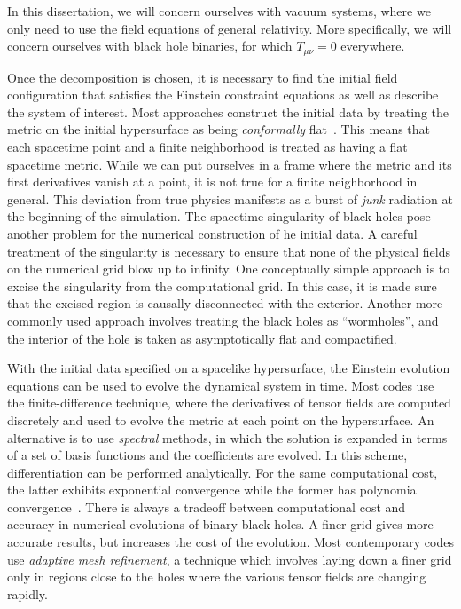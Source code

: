 In this dissertation, we will concern ourselves with vacuum systems, where 
we only need to use the field equations of general relativity. More 
specifically, we will concern ourselves with black hole binaries, for which 
$T_{\mu\nu}=0$ everywhere. 

% 
Once the decomposition is chosen, it is necessary to find the initial 
field configuration that satisfies the Einstein constraint equations as well as
describe the system of interest. Most approaches construct the initial 
data by treating the metric on the initial hypersurface as being 
{\it conformally} flat~\cite{Cook:2000vr}. 
This means that each spacetime point and a finite 
neighborhood is treated as having a flat spacetime metric.
While we can put ourselves in a frame where the metric and its first
derivatives vanish at a point, it is not true for a finite neighborhood in 
general.
This deviation from true physics manifests as a burst of {\it junk}
radiation at the beginning of the simulation. 
%
The spacetime singularity of black holes pose another problem for the 
numerical construction of he initial data. A careful treatment of the 
singularity is necessary to ensure that none of the physical fields on the
numerical grid blow up to infinity. One conceptually simple approach is to 
excise the singularity from the computational grid. In this case, it is
made sure that the excised region is causally disconnected with the exterior. 
Another more commonly used approach involves treating the black holes as 
``wormholes'', and the interior of the hole is taken as asymptotically
flat and compactified. 

With the initial data specified on a spacelike hypersurface, the Einstein 
evolution equations can be used to evolve the dynamical system in time. 
Most codes use the finite-difference technique, where the derivatives of 
tensor fields are computed discretely and used to evolve the metric at
each point on the hypersurface. An alternative is to use {\it spectral}
methods, in which the solution is expanded in terms of a set of basis functions
and the coefficients are evolved. In this scheme, differentiation can be
performed analytically. For the same computational cost, the latter exhibits
exponential convergence while the former has polynomial
convergence~\cite{Hinder:2010vn}. There is always a tradeoff between 
computational cost and accuracy in numerical evolutions of binary black holes. 
A finer grid gives more accurate results, but increases the cost of the 
evolution. Most contemporary codes use {\it adaptive mesh refinement},
a technique which involves laying down a finer grid only in regions close to the
holes where the various tensor fields are changing rapidly.


